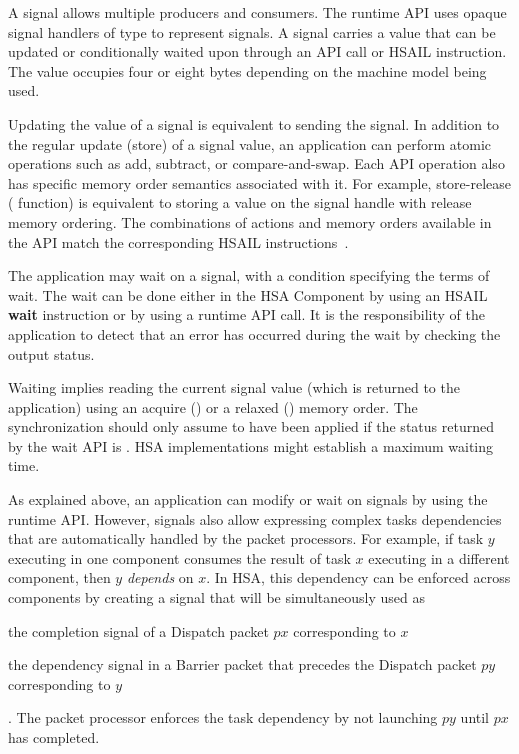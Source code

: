 \documentclass[final]{book}
\newcommand{\reffun}[1]{\textbf{#1}}
\newcommand{\refhsl}[1]{\reffun{#1}}
\begin{document}
A signal allows multiple producers and consumers. The runtime API uses opaque
signal handlers of type  to represent signals. A
signal carries a value that can be updated or conditionally waited upon through
an API call or HSAIL instruction. The value occupies four or eight bytes
depending on the machine model being used.

Updating the value of a signal is equivalent to sending the signal. In addition
to the regular update (store) of a signal value, an application can perform atomic
operations such as add, subtract, or compare-and-swap. Each API operation also
has specific memory order semantics associated with it. For example,
store-release ( function) is equivalent to
storing a value on the signal handle with release memory ordering. The
combinations of actions and memory orders available in the API match the
corresponding HSAIL instructions~\cite{prm}.

The application may wait on a signal, with a condition specifying the terms of
wait. The wait can be done either in the HSA Component by using an HSAIL
\refhsl{wait} instruction or by using a runtime API call. It is the
responsibility of the application to detect that an error has occurred during
the wait by checking the output status.

Waiting implies reading the current signal value (which is returned to the
application) using an acquire () or a relaxed
() memory order. The synchronization should only
assume to have been applied if the status returned by the wait API is
. HSA implementations might establish a maximum
waiting time.

As explained above, an application can modify or wait on signals by using
the runtime API. However, signals also allow expressing complex tasks
dependencies that are automatically handled by the packet processors. For
example, if task $y$ executing in one component consumes the result of task $x$
executing in a different component, then $y$ \textit{depends} on $x$. In HSA,
this dependency can be enforced across components by creating a signal that will
be simultaneously used as \begin{inparaenum}[a\upshape)] \item the completion
signal of a Dispatch packet $px$ corresponding to $x$ \item the dependency
signal in a Barrier packet that precedes the Dispatch packet $py$
corresponding to $y$\end{inparaenum}. The packet processor enforces the
task dependency by not launching $py$ until $px$ has completed.
\end{document}
